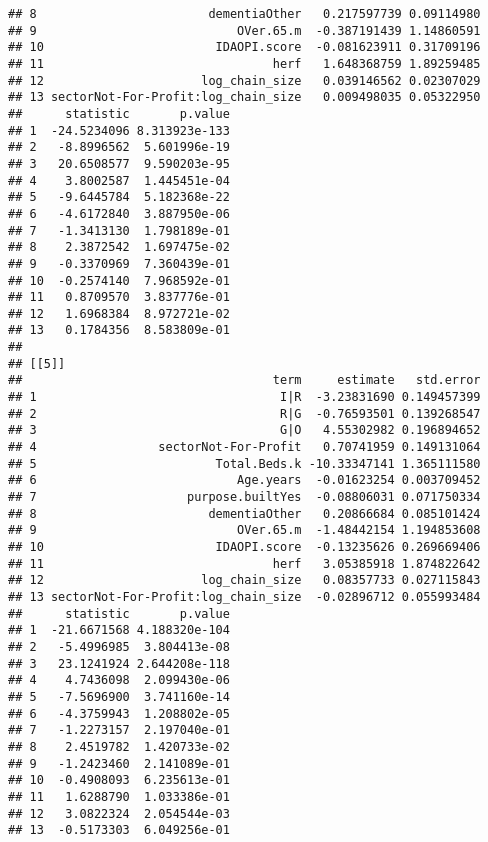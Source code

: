 \documentclass[]{article}
\newenvironment{Shaded}{\begin{snugshade}}{\end{snugshade}}
\newcommand{\KeywordTok}[1]{\textcolor[rgb]{0.13,0.29,0.53}{\textbf{{#1}}}}
\newcommand{\DataTypeTok}[1]{\textcolor[rgb]{0.13,0.29,0.53}{{#1}}}
\newcommand{\DecValTok}[1]{\textcolor[rgb]{0.00,0.00,0.81}{{#1}}}
\newcommand{\NormalTok}[1]{{#1}}
\begin{document}
\begin{verbatim}
## 8                        dementiaOther   0.217597739 0.09114980
## 9                            OVer.65.m  -0.387191439 1.14860591
## 10                        IDAOPI.score  -0.081623911 0.31709196
## 11                                herf   1.648368759 1.89259485
## 12                      log_chain_size   0.039146562 0.02307029
## 13 sectorNot-For-Profit:log_chain_size   0.009498035 0.05322950
##      statistic       p.value
## 1  -24.5234096 8.313923e-133
## 2   -8.8996562  5.601996e-19
## 3   20.6508577  9.590203e-95
## 4    3.8002587  1.445451e-04
## 5   -9.6445784  5.182368e-22
## 6   -4.6172840  3.887950e-06
## 7   -1.3413130  1.798189e-01
## 8    2.3872542  1.697475e-02
## 9   -0.3370969  7.360439e-01
## 10  -0.2574140  7.968592e-01
## 11   0.8709570  3.837776e-01
## 12   1.6968384  8.972721e-02
## 13   0.1784356  8.583809e-01
## 
## [[5]]
##                                   term     estimate   std.error
## 1                                  I|R  -3.23831690 0.149457399
## 2                                  R|G  -0.76593501 0.139268547
## 3                                  G|O   4.55302982 0.196894652
## 4                 sectorNot-For-Profit   0.70741959 0.149131064
## 5                         Total.Beds.k -10.33347141 1.365111580
## 6                            Age.years  -0.01623254 0.003709452
## 7                     purpose.builtYes  -0.08806031 0.071750334
## 8                        dementiaOther   0.20866684 0.085101424
## 9                            OVer.65.m  -1.48442154 1.194853608
## 10                        IDAOPI.score  -0.13235626 0.269669406
## 11                                herf   3.05385918 1.874822642
## 12                      log_chain_size   0.08357733 0.027115843
## 13 sectorNot-For-Profit:log_chain_size  -0.02896712 0.055993484
##      statistic       p.value
## 1  -21.6671568 4.188320e-104
## 2   -5.4996985  3.804413e-08
## 3   23.1241924 2.644208e-118
## 4    4.7436098  2.099430e-06
## 5   -7.5696900  3.741160e-14
## 6   -4.3759943  1.208802e-05
## 7   -1.2273157  2.197040e-01
## 8    2.4519782  1.420733e-02
## 9   -1.2423460  2.141089e-01
## 10  -0.4908093  6.235613e-01
## 11   1.6288790  1.033386e-01
## 12   3.0822324  2.054544e-03
## 13  -0.5173303  6.049256e-01
\end{verbatim}

\begin{Shaded}
\end{Shaded}
\end{document}
